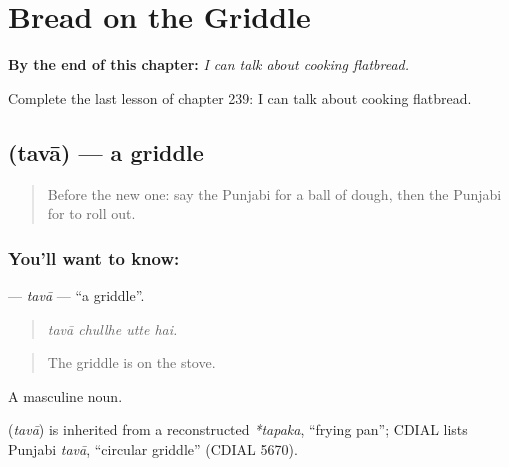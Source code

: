 
\chapter{Bread on the Griddle}
\label{ch:pa-a2-bread-on-the-griddle}

\begin{chapteropening}
\textbf{By the end of this chapter:} \emph{I can talk about cooking flatbread.}

Complete the last lesson of chapter 239: I can talk about cooking flatbread.
\end{chapteropening}

\section[\texorpdfstring{\pa{ਤਵਾ} (tavā)}{ਤਵਾ (tavā)}]{ (tavā) — a griddle}

\label{lesson:PA-C239-tava}



\begin{quote}
Before the new one: say the Punjabi for a ball of dough, then the Punjabi for to roll out.
\end{quote}

\subsection*{You'll want to know: }
\textbf{} — \emph{tavā} — \textquotedblleft{}a griddle\textquotedblright{}.

\begin{quote}
   
\end{quote}

\begin{quote}
\emph{tavā chullhe utte hai.}
\end{quote}

\begin{quote}
The griddle is on the stove.
\end{quote}

A masculine noun.

\begin{cousinweb}
\textbf{} (\emph{tavā}) is inherited from a reconstructed \emph{*tapaka}, \textquotedblleft{}frying pan\textquotedblright{}; CDIAL lists Punjabi \emph{tavā}, \textquotedblleft{}circular griddle\textquotedblright{} (CDIAL 5670).
\end{cousinweb}

